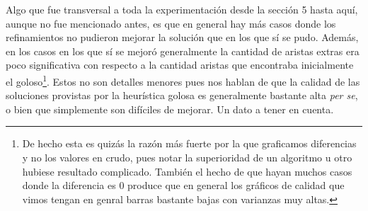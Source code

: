 Algo que fue transversal a toda la experimentación desde la sección 5 hasta aquí, aunque no fue mencionado antes, es que en general hay más casos donde los refinamientos no pudieron mejorar la solución que en los que sí se pudo. Además, en los casos en los que sí se mejoró generalmente la cantidad de aristas extras era poco significativa con respecto a la cantidad aristas que encontraba inicialmente el goloso\footnote{De hecho esta es quizás la razón más fuerte por la que graficamos diferencias y no los valores en crudo, pues notar la superioridad de un algoritmo u otro hubiese resultado complicado. También el hecho de que hayan muchos casos donde la diferencia es 0 produce que en general los gráficos de calidad que vimos tengan en genral barras bastante bajas con varianzas muy altas.}. Estos no son detalles menores pues nos hablan de que la calidad de las soluciones provistas por la heurística golosa es generalmente bastante alta \emph{per se}, o bien que simplemente son difíciles de mejorar. Un dato a tener en cuenta.
 

